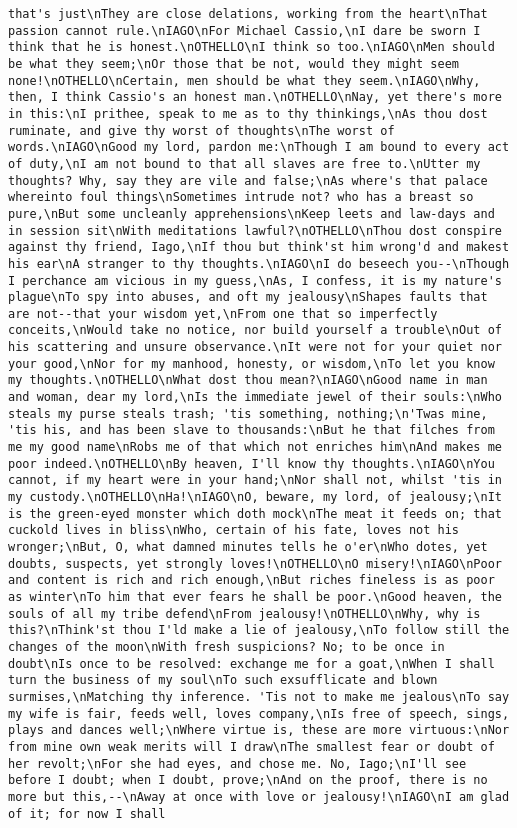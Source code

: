 \begin{verbatim}
that's just\nThey are close delations, working from the heart\nThat passion cannot rule.\nIAGO\nFor Michael Cassio,\nI dare be sworn I think that he is honest.\nOTHELLO\nI think so too.\nIAGO\nMen should be what they seem;\nOr those that be not, would they might seem none!\nOTHELLO\nCertain, men should be what they seem.\nIAGO\nWhy, then, I think Cassio's an honest man.\nOTHELLO\nNay, yet there's more in this:\nI prithee, speak to me as to thy thinkings,\nAs thou dost ruminate, and give thy worst of thoughts\nThe worst of words.\nIAGO\nGood my lord, pardon me:\nThough I am bound to every act of duty,\nI am not bound to that all slaves are free to.\nUtter my thoughts? Why, say they are vile and false;\nAs where's that palace whereinto foul things\nSometimes intrude not? who has a breast so pure,\nBut some uncleanly apprehensions\nKeep leets and law-days and in session sit\nWith meditations lawful?\nOTHELLO\nThou dost conspire against thy friend, Iago,\nIf thou but think'st him wrong'd and makest his ear\nA stranger to thy thoughts.\nIAGO\nI do beseech you--\nThough I perchance am vicious in my guess,\nAs, I confess, it is my nature's plague\nTo spy into abuses, and oft my jealousy\nShapes faults that are not--that your wisdom yet,\nFrom one that so imperfectly conceits,\nWould take no notice, nor build yourself a trouble\nOut of his scattering and unsure observance.\nIt were not for your quiet nor your good,\nNor for my manhood, honesty, or wisdom,\nTo let you know my thoughts.\nOTHELLO\nWhat dost thou mean?\nIAGO\nGood name in man and woman, dear my lord,\nIs the immediate jewel of their souls:\nWho steals my purse steals trash; 'tis something, nothing;\n'Twas mine, 'tis his, and has been slave to thousands:\nBut he that filches from me my good name\nRobs me of that which not enriches him\nAnd makes me poor indeed.\nOTHELLO\nBy heaven, I'll know thy thoughts.\nIAGO\nYou cannot, if my heart were in your hand;\nNor shall not, whilst 'tis in my custody.\nOTHELLO\nHa!\nIAGO\nO, beware, my lord, of jealousy;\nIt is the green-eyed monster which doth mock\nThe meat it feeds on; that cuckold lives in bliss\nWho, certain of his fate, loves not his wronger;\nBut, O, what damned minutes tells he o'er\nWho dotes, yet doubts, suspects, yet strongly loves!\nOTHELLO\nO misery!\nIAGO\nPoor and content is rich and rich enough,\nBut riches fineless is as poor as winter\nTo him that ever fears he shall be poor.\nGood heaven, the souls of all my tribe defend\nFrom jealousy!\nOTHELLO\nWhy, why is this?\nThink'st thou I'ld make a lie of jealousy,\nTo follow still the changes of the moon\nWith fresh suspicions? No; to be once in doubt\nIs once to be resolved: exchange me for a goat,\nWhen I shall turn the business of my soul\nTo such exsufflicate and blown surmises,\nMatching thy inference. 'Tis not to make me jealous\nTo say my wife is fair, feeds well, loves company,\nIs free of speech, sings, plays and dances well;\nWhere virtue is, these are more virtuous:\nNor from mine own weak merits will I draw\nThe smallest fear or doubt of her revolt;\nFor she had eyes, and chose me. No, Iago;\nI'll see before I doubt; when I doubt, prove;\nAnd on the proof, there is no more but this,--\nAway at once with love or jealousy!\nIAGO\nI am glad of it; for now I shall 
\end{verbatim}
